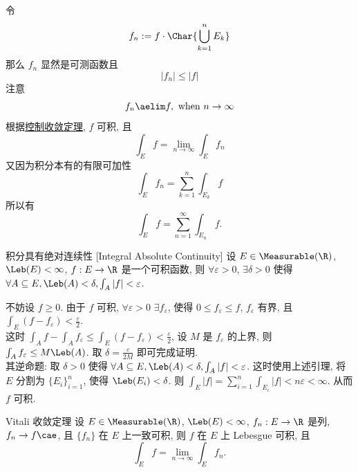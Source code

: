 \begin{prf}
    令 
    \[f_n:=f\cdot\Char{\bigcup_{k=1}^{n}E_k} \]
    那么 \(f_n\) 显然是可测函数且
    \[|f_n|\leq |f|\]
    注意 
    \[f_n\aelim f, \text{ when } n\to\infty \]
    根据\hyperref[thm:dct]{控制收敛定理}, \(f\) 可积, 且
    \[\int_E f=\lim_{n\to\infty}\int_E f_n\]
    又因为积分本有的有限可加性
    \[\int_E f_n=\sum_{k=1}^n\int_{E_k}f\]
    所以有
    \[\int_E f = \sum_{n=1}^{\infty} \int_{E_n} f.\]
\end{prf}
\begin{thm}
    {积分具有绝对连续性}
    [Integral Absolute Continuity]
    设 $E\in\Measurable(\R)$, \(\Leb(E)<\infty\), \(f:E\to\R\) 是一个可积函数, 则 \(\forall\varepsilon>0\), \(\exists\delta>0\) 使得 \(\forall A\subseteq E, \Leb(A)<\delta, \int_A |f|<\varepsilon\).
\end{thm}
\begin{prf}
    不妨设 $f\geq 0$. 由于 $f$ 可积, $\forall\varepsilon>0$ $\exists f_\varepsilon$, 使得 $0\leq f_\varepsilon\leq f$, $f_\varepsilon$ 有界, 且 $\int_E (f-f_\varepsilon)<\frac{\varepsilon}{2}$. \\
    这时 $\int_A f - \int_A f_\varepsilon \leq \int_E (f-f_\varepsilon) < \frac{\varepsilon}{2}$, 设 $M$ 是 $f_\varepsilon$ 的上界, 则 $\int_A f_\varepsilon \leq M\Leb(A)$. 取 $\delta=\frac{\varepsilon}{2M}$ 即可完成证明. \\
    其逆命题: 取 $\delta>0$ 使得 $\forall A\subseteq E, \Leb(A)<\delta, \int_A |f|<\varepsilon$. 这时使用上述引理, 将 $E$ 分割为 $\{E_i\}_{i=1}^n$, 使得 $\Leb(E_i)<\delta$. 则 $\int_E |f| = \sum_{i=1}^n \int_{E_i} |f| < n\varepsilon < \infty$. 从而 $f$ 可积.
\end{prf}
\begin{thm}
    [vct-1]
    {Vitali 收敛定理}
    设 $E\in\Measurable(\R)$, \(\Leb(E)<\infty\), \(f_n:E\to\R\) 是\MeasurableFunc{}列, \( f_n\rightarrow f\cae\), 且 \(\{f_n\}\) 在 \(E\) 上一致可积, 则 \(f\) 在 \(E\) 上 Lebesgue 可积, 且
    \[\int_E f = \lim_{n\to\infty}\int_E f_n.\]
\end{thm}

